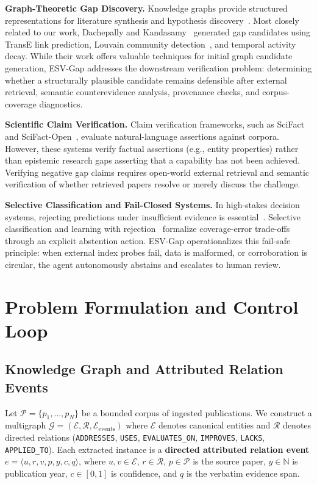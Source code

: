 \documentclass[runningheads]{llncs}
\newcommand{\method}{ESV-Gap}
\begin{document}
\noindent\textbf{Graph-Theoretic Gap Discovery.} Knowledge graphs provide structured representations for literature synthesis and hypothesis discovery~\cite{swanson1986fish,schneider2022decade,chen2019ukge}. Most closely related to our work, Dachepally and Kandasamy~\cite{rahul2026dynamic} generated gap candidates using TransE link prediction, Louvain community detection~\cite{blondel2008fast}, and temporal activity decay. While their work offers valuable techniques for initial graph candidate generation, \method{} addresses the downstream verification problem: determining whether a structurally plausible candidate remains defensible after external retrieval, semantic counterevidence analysis, provenance checks, and corpus-coverage diagnostics.

\noindent\textbf{Scientific Claim Verification.} Claim verification frameworks, such as SciFact~\cite{wadden2020scifact} and SciFact-Open~\cite{wadden2022scifactopen}, evaluate natural-language assertions against corpora. However, these systems verify factual assertions (e.g., entity properties) rather than epistemic research gaps asserting that a capability has not been achieved. Verifying negative gap claims requires open-world external retrieval and semantic verification of whether retrieved papers resolve or merely discuss the challenge.

\noindent\textbf{Selective Classification and Fail-Closed Systems.} In high-stakes decision systems, rejecting predictions under insufficient evidence is essential~\cite{saltzer1975protection,shneiderman2020hcai}. Selective classification and learning with rejection~\cite{cortes2016learning,geifman2017selective} formalize coverage-error trade-offs through an explicit abstention action. \method{} operationalizes this fail-safe principle: when external index probes fail, data is malformed, or corroboration is circular, the agent autonomously abstains and escalates to human review.

\section{Problem Formulation and Control Loop}
\label{sec:problem}

\subsection{Knowledge Graph and Attributed Relation Events}
Let $\mathcal{P} = \{p_1, \dots, p_N\}$ be a bounded corpus of ingested publications. We construct a multigraph $\mathcal{G} = (\mathcal{E}, \mathcal{R}, \mathcal{E}_{\text{events}})$ where $\mathcal{E}$ denotes canonical entities and $\mathcal{R}$ denotes directed relations (\texttt{ADDRESSES}, \texttt{USES}, \texttt{EVALUATES\_ON}, \texttt{IMPROVES}, \texttt{LACKS}, \texttt{APPLIED\_\allowbreak TO}). Each extracted instance is a \textbf{directed attributed relation event} $e = \langle u, r, v, p, y, c, q \rangle$, where $u, v \in \mathcal{E}$, $r \in \mathcal{R}$, $p \in \mathcal{P}$ is the source paper, $y \in \mathbb{N}$ is publication year, $c \in [0, 1]$ is confidence, and $q$ is the verbatim evidence span.
\end{document}
